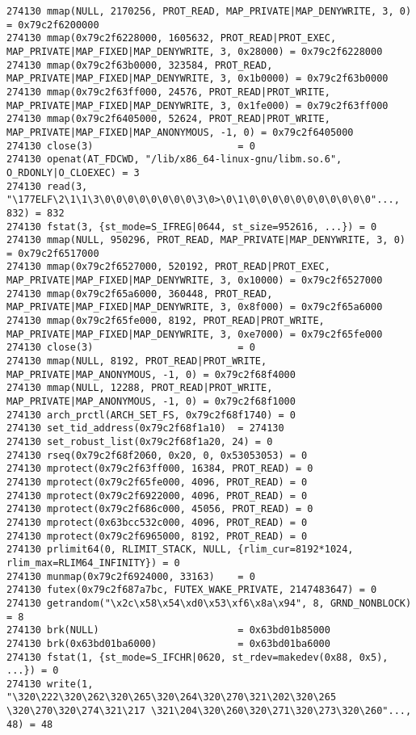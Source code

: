 \begin{verbatim}
274130 mmap(NULL, 2170256, PROT_READ, MAP_PRIVATE|MAP_DENYWRITE, 3, 0) = 0x79c2f6200000
274130 mmap(0x79c2f6228000, 1605632, PROT_READ|PROT_EXEC, MAP_PRIVATE|MAP_FIXED|MAP_DENYWRITE, 3, 0x28000) = 0x79c2f6228000
274130 mmap(0x79c2f63b0000, 323584, PROT_READ, MAP_PRIVATE|MAP_FIXED|MAP_DENYWRITE, 3, 0x1b0000) = 0x79c2f63b0000
274130 mmap(0x79c2f63ff000, 24576, PROT_READ|PROT_WRITE, MAP_PRIVATE|MAP_FIXED|MAP_DENYWRITE, 3, 0x1fe000) = 0x79c2f63ff000
274130 mmap(0x79c2f6405000, 52624, PROT_READ|PROT_WRITE, MAP_PRIVATE|MAP_FIXED|MAP_ANONYMOUS, -1, 0) = 0x79c2f6405000
274130 close(3)                         = 0
274130 openat(AT_FDCWD, "/lib/x86_64-linux-gnu/libm.so.6", O_RDONLY|O_CLOEXEC) = 3
274130 read(3, "\177ELF\2\1\1\3\0\0\0\0\0\0\0\0\3\0>\0\1\0\0\0\0\0\0\0\0\0\0\0"..., 832) = 832
274130 fstat(3, {st_mode=S_IFREG|0644, st_size=952616, ...}) = 0
274130 mmap(NULL, 950296, PROT_READ, MAP_PRIVATE|MAP_DENYWRITE, 3, 0) = 0x79c2f6517000
274130 mmap(0x79c2f6527000, 520192, PROT_READ|PROT_EXEC, MAP_PRIVATE|MAP_FIXED|MAP_DENYWRITE, 3, 0x10000) = 0x79c2f6527000
274130 mmap(0x79c2f65a6000, 360448, PROT_READ, MAP_PRIVATE|MAP_FIXED|MAP_DENYWRITE, 3, 0x8f000) = 0x79c2f65a6000
274130 mmap(0x79c2f65fe000, 8192, PROT_READ|PROT_WRITE, MAP_PRIVATE|MAP_FIXED|MAP_DENYWRITE, 3, 0xe7000) = 0x79c2f65fe000
274130 close(3)                         = 0
274130 mmap(NULL, 8192, PROT_READ|PROT_WRITE, MAP_PRIVATE|MAP_ANONYMOUS, -1, 0) = 0x79c2f68f4000
274130 mmap(NULL, 12288, PROT_READ|PROT_WRITE, MAP_PRIVATE|MAP_ANONYMOUS, -1, 0) = 0x79c2f68f1000
274130 arch_prctl(ARCH_SET_FS, 0x79c2f68f1740) = 0
274130 set_tid_address(0x79c2f68f1a10)  = 274130
274130 set_robust_list(0x79c2f68f1a20, 24) = 0
274130 rseq(0x79c2f68f2060, 0x20, 0, 0x53053053) = 0
274130 mprotect(0x79c2f63ff000, 16384, PROT_READ) = 0
274130 mprotect(0x79c2f65fe000, 4096, PROT_READ) = 0
274130 mprotect(0x79c2f6922000, 4096, PROT_READ) = 0
274130 mprotect(0x79c2f686c000, 45056, PROT_READ) = 0
274130 mprotect(0x63bcc532c000, 4096, PROT_READ) = 0
274130 mprotect(0x79c2f6965000, 8192, PROT_READ) = 0
274130 prlimit64(0, RLIMIT_STACK, NULL, {rlim_cur=8192*1024, rlim_max=RLIM64_INFINITY}) = 0
274130 munmap(0x79c2f6924000, 33163)    = 0
274130 futex(0x79c2f687a7bc, FUTEX_WAKE_PRIVATE, 2147483647) = 0
274130 getrandom("\x2c\x58\x54\xd0\x53\xf6\x8a\x94", 8, GRND_NONBLOCK) = 8
274130 brk(NULL)                        = 0x63bd01b85000
274130 brk(0x63bd01ba6000)              = 0x63bd01ba6000
274130 fstat(1, {st_mode=S_IFCHR|0620, st_rdev=makedev(0x88, 0x5), ...}) = 0
274130 write(1, "\320\222\320\262\320\265\320\264\320\270\321\202\320\265 \320\270\320\274\321\217 \321\204\320\260\320\271\320\273\320\260"..., 48) = 48

\end{verbatim}
